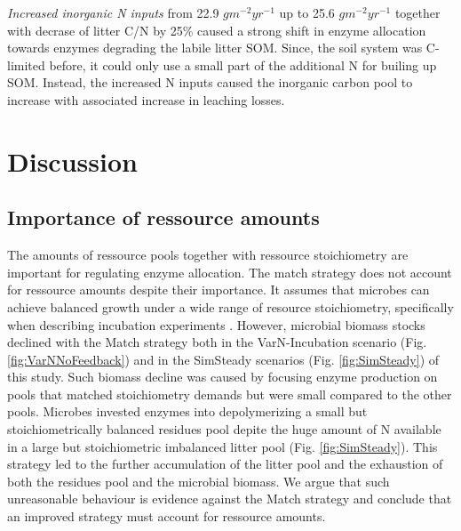 \textit{Increased inorganic N inputs} from 22.9 $gm^{-2}yr^{-1}$ up to 25.6
$gm^{-2}yr^{-1}$ together with decrase of litter C/N by 25\% caused a strong
shift in enzyme allocation towards enzymes degrading the labile litter SOM.
Since, the soil system was C-limited before, it could only use a small part of
the additional N for builing up SOM.
Instead, the increased N inputs caused the inorganic carbon pool to increase
with associated increase in leaching losses.

\section{Discussion}
\subsection{Importance of ressource amounts}
The amounts of ressource pools together with ressource stoichiometry are
important for regulating enzyme allocation. The match strategy does not account
for ressource amounts despite their importance. It assumes that microbes can
achieve balanced growth under a wide range of resource stoichiometry,
specifically when describing incubation experiments \citep{Moorhead12,
Ballentine14}. However, microbial biomass stocks declined with the Match
strategy both in the VarN-Incubation scenario (Fig. \ref{fig:VarNNoFeedback})
and in the SimSteady scenarios (Fig. \ref{fig:SimSteady}) of this study. Such
biomass decline was caused by focusing enzyme production on pools that matched
stoichiometry demands but were small compared to the other pools. Microbes
invested enzymes into depolymerizing a small but stoichiometrically balanced
residues pool depite the huge amount of N available in a large but
stoichiometric imbalanced litter pool (Fig.
\ref{fig:SimSteady}). This strategy led to the further accumulation of the
litter pool and the exhaustion of both the residues pool and the microbial
biomass. We argue that such unreasonable behaviour is evidence against the Match
strategy and conclude that an improved strategy must account for ressource
amounts.

